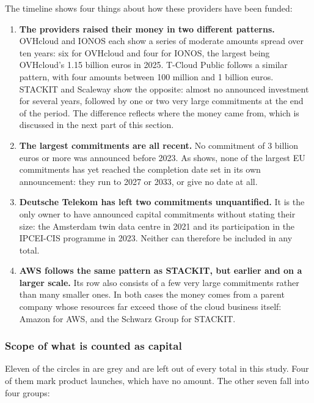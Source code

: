 The timeline shows four things about how these providers have been funded:

\begin{enumerate}
  \item \textbf{The providers raised their money in two different patterns.}
  OVHcloud and IONOS each show a series of moderate amounts spread over ten years:
  six for OVHcloud and four for IONOS, the largest being OVHcloud's 1.15 billion
  euros in 2025. T-Cloud Public follows a similar pattern, with four amounts
  between 100 million and 1 billion euros. STACKIT and Scaleway show the opposite:
  almost no announced investment for several years, followed by one or two very
  large commitments at the end of the period. The difference reflects where the
  money came from, which is discussed in the next part of this section.

  \item \textbf{The largest commitments are all recent.} No commitment of 3 billion
  euros or more was announced before 2023. As  shows,
  none of the largest \acs{EU} commitments has yet reached the completion date set
  in its own announcement: they run to 2027 or 2033, or give no date at all.

  \item \textbf{Deutsche Telekom has left two commitments unquantified.} It is the
  only owner to have announced capital commitments without stating their size:
  the Amsterdam twin data centre in 2021 and its participation in the
  \acs{IPCEI}-CIS programme in 2023. Neither can therefore be included in any
  total.

  \item \textbf{AWS follows the same pattern as STACKIT, but earlier and on a
  larger scale.} Its row also consists of a few very large commitments rather than
  many smaller ones. In both cases the money comes from a parent company whose
  resources far exceed those of the cloud business itself: Amazon for \acs{AWS},
  and the Schwarz Group for STACKIT.
\end{enumerate}

\subsubsection*{Scope of what is counted as capital}

Eleven of the circles in  are grey and are left out of
every total in this study. Four of them mark product launches, which have no amount.
The other seven fall into four groups:

